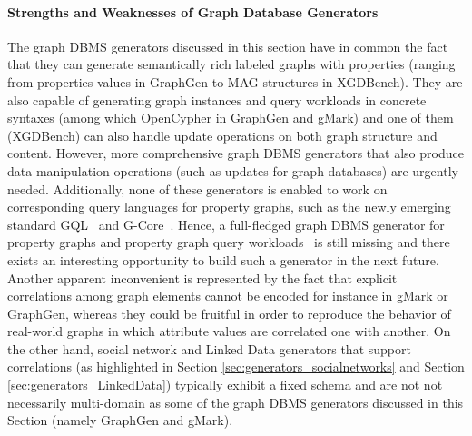 \paragraph{Strengths and Weaknesses of Graph Database Generators}
The graph DBMS generators discussed in this section have in common the fact that they can generate semantically rich labeled graphs with properties (ranging from properties values in GraphGen to MAG structures in XGDBench). They are also capable of generating graph instances and query workloads in
concrete syntaxes (among which OpenCypher in GraphGen and gMark) and one of them (XGDBench) can also handle update operations on both graph structure and content. However, more comprehensive graph DBMS generators that also produce data manipulation operations (such as updates for graph databases) are urgently needed. Additionally, none of these generators is enabled to work on corresponding query languages for property graphs, such as the newly emerging standard GQL~\cite{gql-2018} and G-Core~\cite{AnglesABBFGLPPS18}. Hence, a full-fledged graph DBMS generator for property graphs and property graph query workloads~\cite{BFVY18} is still missing and there exists an interesting opportunity to build such a generator in the next future.
Another apparent inconvenient is represented by the fact that explicit correlations among graph elements cannot be encoded for instance in gMark or GraphGen, whereas they could be fruitful in order to reproduce the behavior of real-world graphs in which attribute values are correlated one with another. On the other hand, social network and Linked Data generators that support correlations (as highlighted in Section \ref{sec:generators_socialnetworks} and Section \ref{sec:generators_LinkedData}) typically exhibit a fixed schema and are not not necessarily multi-domain as some of the graph DBMS generators discussed in this Section (namely GraphGen and gMark).

